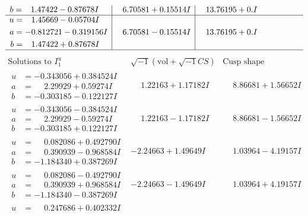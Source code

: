\documentclass[1p]{elsarticle_modified}
\theoremstyle{definition}
\newcommand{\I}{\sqrt{-1}}
\begin{document}
$$\begin{array}{c|c|c}
\begin{aligned}
b &= \phantom{-}1.47422 - 0.87678 I\end{aligned}
 & \phantom{-}6.70581 + 0.15514 I & \phantom{-}13.76195 + 0. I\phantom{ +0.000000I} \\ \hline\begin{aligned}
u &= \phantom{-}1.45669 - 0.05704 I \\
a &= -0.812721 - 0.319156 I \\
b &= \phantom{-}1.47422 + 0.87678 I\end{aligned}
 & \phantom{-}6.70581 - 0.15514 I & \phantom{-}13.76195 + 0. I\phantom{ +0.000000I}\\
 \hline 
 \end{array}$$\newpage$$\begin{array}{c|c|c}  
\text{Solutions to }I^u_{1}& \I (\text{vol} + \sqrt{-1}CS) & \text{Cusp shape}\\
 \hline 
\begin{aligned}
u &= -0.343056 + 0.384524 I \\
a &= \phantom{-}2.29929 + 0.59274 I \\
b &= -0.303185 - 0.122127 I\end{aligned}
 & \phantom{-}1.22163 + 1.17182 I & \phantom{-}8.86681 + 1.56652 I \\ \hline\begin{aligned}
u &= -0.343056 - 0.384524 I \\
a &= \phantom{-}2.29929 - 0.59274 I \\
b &= -0.303185 + 0.122127 I\end{aligned}
 & \phantom{-}1.22163 - 1.17182 I & \phantom{-}8.86681 - 1.56652 I \\ \hline\begin{aligned}
u &= \phantom{-}0.082086 + 0.492790 I \\
a &= \phantom{-}0.390939 - 0.968584 I \\
b &= -1.184340 + 0.387269 I\end{aligned}
 & -2.24663 + 1.49649 I & \phantom{-}1.03964 - 4.19157 I \\ \hline\begin{aligned}
u &= \phantom{-}0.082086 - 0.492790 I \\
a &= \phantom{-}0.390939 + 0.968584 I \\
b &= -1.184340 - 0.387269 I\end{aligned}
 & -2.24663 - 1.49649 I & \phantom{-}1.03964 + 4.19157 I \\ \hline\begin{aligned}
u &= \phantom{-}0.247686 + 0.402332 I \\

\end{aligned}
\end{array}$$
\end{document}
